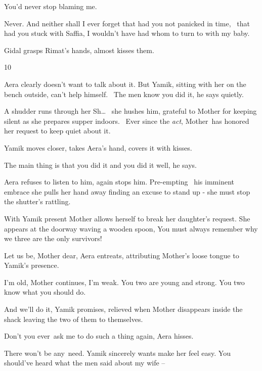 \documentclass[letterpaper]{article}
\begin{document}
{\textquotedbl}You'd never stop blaming me.{\textquotedbl} 

{\textquotedbl}Never. And neither shall I ever forget that had you not panicked in time, {\ }that had you
stuck with Saffia, I wouldn't have had whom to turn to with my baby.{\textquotedbl}

Gidal grasps Rimat's hands, almost kisses them. ~


\bigskip

10 

Aera clearly doesn't want to talk about it. But Yamik, sitting with her on the bench outside, can't help himself.
\ {\textquotedbl}The men know you did it,{\textquotedbl} he says quietly.

A shudder runs through her {\textquotedbl}Sh{\dots}{\textquotedbl} \ she hushes him, grateful to Mother for keeping
silent as she prepares supper indoors.~ Ever since the \textit{act}, Mother~has honored her request to keep quiet about
it. 

Yamik moves closer, takes Aera's hand, covers it with kisses. 

{\textquotedbl}The main thing is that you did it and you did it well,{\textquotedbl} he says.

Aera refuses to listen to him, again stops him. Pre-empting{ }\ his imminent embrace she pulls her hand
away finding an excuse to stand up - she must stop the shutter's rattling.

With Yamik present Mother allows herself to break her daughter's request. She appears at the doorway waving a wooden
spoon, {\textquotedbl}You must always remember why we three are the only survivors!{\textquotedbl} 

{\textquotedbl}Let us be, Mother dear,{\textquotedbl} Aera entreats, attributing Mother's loose tongue to Yamik's
presence.

{\textquotedbl}I'm old,{\textquotedbl} Mother continues, {\textquotedbl}I'm weak. You two are young and strong. You two
know what you should do.{\textquotedbl}

{\textquotedbl}And we'll do it,{\textquotedbl} Yamik promises, relieved when Mother disappears inside the shack leaving
the two of them to themselves. 

{\textquotedbl}Don't you ever~ask me to do such a thing again,{\textquotedbl} Aera hisses. 

{\textquotedbl}There won't be any~need.{\textquotedbl} Yamik sincerely wants make her feel easy. {\textquotedbl}You
should've heard what the men said about my wife --{\textquotedbl} 
\end{document}
